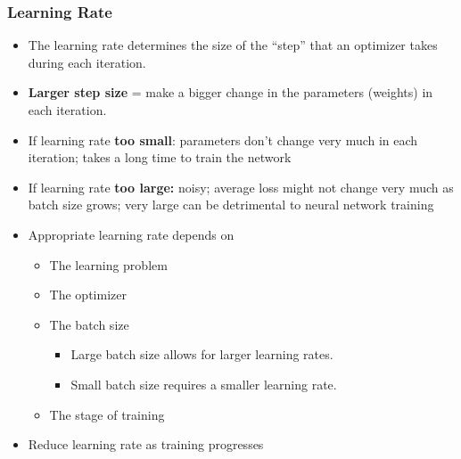 \documentclass[11pt]{article}
\begin{document}
\subsubsection{Learning Rate}
\begin{itemize}
\item The learning rate determines the size of the “step” that an optimizer takes during each iteration.
\item \textbf{Larger step size} = make a bigger change in the parameters (weights) in each iteration.
\item If learning rate \textbf{too small}: parameters don’t change
very much in each iteration; takes a long time to train the network
\item If learning rate \textbf{too large:} noisy; average loss might not change very much as batch size grows; very large can be detrimental to neural network training
\item Appropriate learning rate depends on 
\begin{itemize}
\item The learning problem
\item The optimizer
\item The batch size
\begin{itemize}
\item Large batch size allows for larger learning rates. 
\item Small batch size requires a smaller learning rate.
\end{itemize} 
\item The stage of training
\end{itemize}
\item Reduce learning rate as training progresses
\end{itemize}
\end{document}

